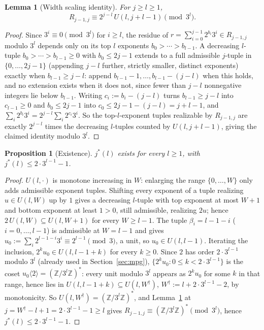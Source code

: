 \documentclass[11pt]{amsart}
\theoremstyle{plain}
\newtheorem{proposition}[theorem]{Proposition}
\newtheorem{lemma}[theorem]{Lemma}
\theoremstyle{definition}
\theoremstyle{remark}
\newcommand{\Z}{\mathbb{Z}}
\begin{document}
\begin{lemma}[Width scaling identity]
\label{lem:UW}
For $j\ge l\ge1$,
\begin{equation}
\label{eq:UW}
R_{j-1,j} \equiv 2^{j-l}\,U(l,j+l-1) \pmod{3^l}.
\end{equation}
\end{lemma}

\begin{proof}
Since $3^i\equiv0\pmod{3^l}$ for $i\ge l$, the residue of $r=\sum_{i=0}^{j-1}2^{b_i}3^i\in R_{j-1,j}$
modulo $3^l$ depends only on its top $l$ exponents $b_0>\cdots>b_{l-1}$. A decreasing $l$-tuple
$b_0>\cdots>b_{l-1}\ge0$ with $b_0\le2j-1$ extends to a full admissible $j$-tuple in
$\{0,\dots,2j-1\}$ (appending $j-l$ further, strictly smaller, distinct exponents) exactly when
$b_{l-1}\ge j-l$: append $b_{l-1}-1,\dots,b_{l-1}-(j-l)$ when this holds, and no extension exists
when it does not, since fewer than $j-l$ nonnegative integers lie below $b_{l-1}$. Writing
$c_i := b_i-(j-l)$ turns $b_{l-1}\ge j-l$ into $c_{l-1}\ge0$ and $b_0\le2j-1$ into
$c_0\le2j-1-(j-l)=j+l-1$, and $\sum_i2^{b_i}3^i = 2^{j-l}\sum_i2^{c_i}3^i$. So the top-$l$-exponent
tuples realizable by $R_{j-1,j}$ are exactly $2^{j-l}$ times the decreasing $l$-tuples counted by
$U(l,j+l-1)$, giving the claimed identity modulo $3^l$.
\end{proof}

\begin{proposition}[Existence]
\label{prop:exist}
$j^*(l)$ exists for every $l\ge1$, with $j^*(l)\le2\cdot3^{l-1}-1$.
\end{proposition}

\begin{proof}
$U(l,\cdot)$ is monotone increasing in $W$: enlarging the range $\{0,\dots,W\}$ only adds admissible
exponent tuples. Shifting every exponent of a tuple realizing $u\in U(l,W)$ up by $1$ gives a
decreasing $l$-tuple with top exponent at most $W+1$ and bottom exponent at least $1>0$, still
admissible, realizing $2u$; hence $2\,U(l,W)\subseteq U(l,W+1)$ for every $W\ge l-1$. The tuple
$\beta_i=l-1-i$ ($i=0,\dots,l-1$) is admissible at $W=l-1$ and gives
$u_0:=\sum_i2^{l-1-i}3^i\equiv2^{l-1}\pmod3$, a unit, so $u_0\in U(l,l-1)$. Iterating the inclusion,
$2^ku_0\in U(l,l-1+k)$ for every $k\ge0$. Since $2$ has order $2\cdot3^{l-1}$ modulo $3^l$ (already
used in Section~\ref{sec:mpg}), $\{2^ku_0 : 0\le k<2\cdot3^{l-1}\}$ is the coset $u_0\langle2\rangle
=(\Z/3^l\Z)^*$: every unit modulo $3^l$ appears as $2^ku_0$ for some $k$ in that range, hence lies in
$U(l,l-1+k)\subseteq U(l,W^\dagger)$, $W^\dagger:=l+2\cdot3^{l-1}-2$, by monotonicity. So
$U(l,W^\dagger)=(\Z/3^l\Z)^*$, and Lemma~\ref{lem:UW} at $j=W^\dagger-l+1=2\cdot3^{l-1}-1\ge l$ gives
$R_{j-1,j}\equiv(\Z/3^l\Z)^*\pmod{3^l}$, hence $j^*(l)\le2\cdot3^{l-1}-1$.
\end{proof}
\end{document}
